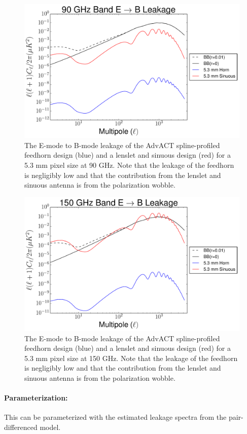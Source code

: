 \begin{figure}[h!]
\centering
\includegraphics[width=\textwidth]{figures/90GHz_band_UEE_pixel_size_horn_sinuous_5p3mm.pdf}
\caption{The E-mode to B-mode leakage of the AdvACT spline-profiled feedhorn design (blue) and a lenslet and sinuous design (red) for a 5.3 mm pixel size at 90 GHz. Note that the leakage of the feedhorn is negligibly low and that the contribution from the lenslet and sinuous antenna is from the polarization wobble.}
\label{fig:MF_90_EB_leakage}
\end{figure}

\begin{figure}[h!]
\centering
\includegraphics[width=\textwidth]{figures/150GHz_band_UEE_pixel_size_horn_sinuous_5p3mm.pdf}
\caption{The E-mode to B-mode leakage of the AdvACT spline-profiled feedhorn design (blue) and a lenslet and sinuous design (red) for a 5.3 mm pixel size at 150 GHz. Note that the leakage of the feedhorn is negligibly low and that the contribution from the lenslet and sinuous antenna is from the polarization wobble.}
\label{fig:MF_150_EB_leakage}
\end{figure}

\paragraph{Parameterization:}
This can be parameterized with the estimated leakage spectra from the pair-differenced model.

